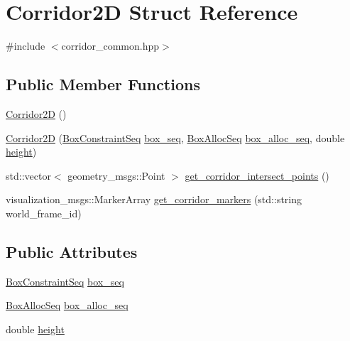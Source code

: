 \hypertarget{struct_corridor2_d}{}\section{Corridor2D Struct Reference}
\label{struct_corridor2_d}


{\ttfamily \#include $<$corridor\+\_\+common.\+hpp$>$}

\subsection*{Public Member Functions}
\begin{DoxyCompactItemize}
\item 
\hyperlink{struct_corridor2_d_a7c7b0f2c9075543a29b39fdaa54f55c9}{Corridor2D} ()
\item 
\hyperlink{struct_corridor2_d_ae6b45a137b041daaf8a2c14f407d3891}{Corridor2D} (\hyperlink{corridor__common_8hpp_a14a6c0d0a5d79585147d5bab3bbb030a}{Box\+Constraint\+Seq} \hyperlink{struct_corridor2_d_a27a5f40ad109bda315a8bb67b517da28}{box\+\_\+seq}, \hyperlink{corridor__common_8hpp_a631ecdcd7d0a6bd15a6625fccbba7909}{Box\+Alloc\+Seq} \hyperlink{struct_corridor2_d_aa9eb677a900b8d7f875759e8f82d2b93}{box\+\_\+alloc\+\_\+seq}, double \hyperlink{struct_corridor2_d_a628834c7de6b20219858979b8ae5f3fa}{height})
\item 
std\+::vector$<$ geometry\+\_\+msgs\+::\+Point $>$ \hyperlink{struct_corridor2_d_a2b9a421e9f17340020bf16c286f4a246}{get\+\_\+corridor\+\_\+intersect\+\_\+points} ()
\item 
visualization\+\_\+msgs\+::\+Marker\+Array \hyperlink{struct_corridor2_d_a67ee02cbba27930d261fa313d2d83cc2}{get\+\_\+corridor\+\_\+markers} (std\+::string world\+\_\+frame\+\_\+id)
\end{DoxyCompactItemize}
\subsection*{Public Attributes}
\begin{DoxyCompactItemize}
\item 
\hyperlink{corridor__common_8hpp_a14a6c0d0a5d79585147d5bab3bbb030a}{Box\+Constraint\+Seq} \hyperlink{struct_corridor2_d_a27a5f40ad109bda315a8bb67b517da28}{box\+\_\+seq}
\item 
\hyperlink{corridor__common_8hpp_a631ecdcd7d0a6bd15a6625fccbba7909}{Box\+Alloc\+Seq} \hyperlink{struct_corridor2_d_aa9eb677a900b8d7f875759e8f82d2b93}{box\+\_\+alloc\+\_\+seq}
\item 
double \hyperlink{struct_corridor2_d_a628834c7de6b20219858979b8ae5f3fa}{height}
\end{DoxyCompactItemize}


